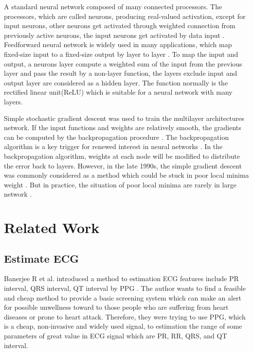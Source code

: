 \documentclass[a4paper,12pt]{article}
\begin{document}
A standard neural network composed of many connected processors. The processors, which are called neurons,  producing real-valued activation, except for input neurons, other neurons get activated through weighted connection from previously active neurons, the input neurons get activated by data input \autocite{Schmidhuber:2015deep}. Feedforward neural network is widely used in many applications, which map fixed-size input to a fixed-size output by layer to layer \autocite{Lecun:2015deep}. To map the input and output, a neurons layer compute a weighted sum of the input from the previous layer and pass the result by a non-layer function, the layers exclude input and output layer are considered as a hidden layer. The function normally is the rectified linear unit(ReLU) which is suitable for a neural network with many layers. 

Simple stochastic gradient descent was used to train the multilayer architectures network. If the input functions and weights are relatively smooth, the gradients can be computed by the backpropagation procedure \autocite{Lecun:2015deep}. The backpropagation algorithm is a key trigger for renewed interest in neural networks \autocite{wiki:neuralnetwork}. In the backpropagation algorithm, weights at each node will be modified to distribute the error back to layers. However, in the late 1990s, the simple gradient descent was commonly considered as a method which could be stuck in poor local minima weight \autocite{Lecun:2015deep}. But in practice, the situation of poor local minima are rarely in large network \autocite{Lecun:2015deep}.

\section{Related Work}
\subsection{Estimate ECG}
Banerjee R et al. introduced a method to estimation ECG features include PR interval, QRS interval, QT interval by PPG \autocite{Banerjee:2013estimation}. The author wants to find a feasible and cheap method to provide a basic screening system which can make an alert for possible unwellness toward to those people who are suffering from heart diseases or prone to heart attack. Therefore, they were trying to use PPG, which is a cheap, non-invasive and widely used signal, to estimation the range of some parameters of great value in ECG signal which are PR, RR, QRS, and QT interval. 
\end{document}
